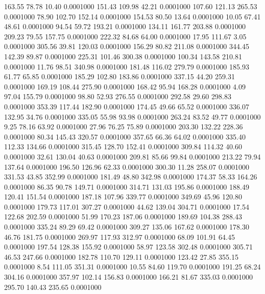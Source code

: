  163.55   78.78   10.40   0.0001000
 151.43  109.98   42.21   0.0001000
 107.60  121.13  265.53   0.0001000
  78.90  102.70  152.14   0.0001000
 154.53   80.50   13.64   0.0001000
  10.05   67.41   48.61   0.0001000
  94.54   59.72  193.21   0.0001000
 134.11  161.77  203.88   0.0001000
 209.23   79.55  157.75   0.0001000
 222.32   84.68   64.00   0.0001000
  17.95  111.67    3.05   0.0001000
 305.56   39.81  120.03   0.0001000
 156.29   80.82  211.08   0.0001000
 344.45  142.39   89.87   0.0001000
 225.31  101.46  300.38   0.0001000
 100.34  143.58  210.81   0.0001000
  11.76   98.51  340.98   0.0001000
 181.48  116.02  279.79   0.0001000
 185.93   61.77   65.85   0.0001000
 185.29  102.80  183.86   0.0001000
 337.15   44.20  259.31   0.0001000
 169.19  108.44  275.90   0.0001000
 168.42   95.94  168.28   0.0001000
   4.09   97.04  155.79   0.0001000
  98.80   52.93  276.55   0.0001000
 292.58   29.60  298.83   0.0001000
 353.39  117.44  182.90   0.0001000
 174.45   49.66   65.52   0.0001000
 336.07  132.95   34.76   0.0001000
 335.05   55.98   93.98   0.0001000
 263.24   83.52   49.77   0.0001000
   9.25   78.16   63.92   0.0001000
  27.96   76.25   75.89   0.0001000
 203.30  132.22  228.36   0.0001000
  80.34  145.43  320.57   0.0001000
 357.65   66.36   64.02   0.0001000
 335.40  112.33  134.66   0.0001000
 315.45  128.70  152.41   0.0001000
 309.84  114.32   40.60   0.0001000
  32.61  130.04   40.63   0.0001000
 209.81   85.66   99.84   0.0001000
 213.22   79.94  137.64   0.0001000
 196.50  126.96   62.33   0.0001000
 300.30   11.28  258.07   0.0001000
 331.53   43.85  352.99   0.0001000
 181.49   48.80  342.98   0.0001000
 174.37   58.33  164.26   0.0001000
  86.35   90.78  149.71   0.0001000
 314.71  131.03  195.86   0.0001000
 188.49  120.41  151.54   0.0001000
 187.18  107.96  339.77   0.0001000
 349.69   45.96  120.80   0.0001000
 179.73  117.01  307.27   0.0001000
  44.62  139.04  304.71   0.0001000
  17.54  122.68  202.59   0.0001000
  51.99  170.23  187.06   0.0001000
 189.69  104.38  288.43   0.0001000
 335.24   89.29   69.42   0.0001000
 309.27  135.06  167.62   0.0001000
 178.30   46.76  181.75   0.0001000
 269.97  117.93  312.97   0.0001000
  68.09  101.91   64.45   0.0001000
 197.54  128.38  155.92   0.0001000
  58.97  123.58  302.48   0.0001000
 305.71   46.53  247.66   0.0001000
 182.78  110.70  129.11   0.0001000
 123.42   27.85  355.15   0.0001000
   8.54  111.05  351.31   0.0001000
  10.55   84.60  119.70   0.0001000
 191.25   68.24  304.16   0.0001000
 357.97  102.14  156.83   0.0001000
 166.21   81.67  335.03   0.0001000
 295.70  140.43  235.65   0.0001000
